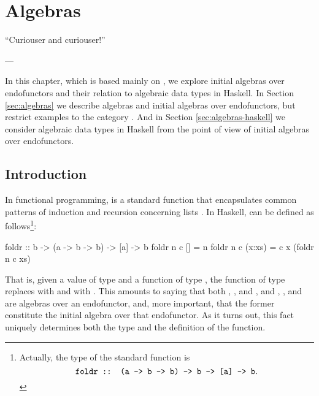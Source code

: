 \chapter{Algebras}
\label{chap:algebras}

\epigraph{
  ``Curiouser and curiouser!''
}{---\textcite[23]{carroll-2004}}

In this chapter, which is based mainly on \parencite[§
2.1]{vene-2000}, we explore initial algebras over endofunctors and
their relation to algebraic data types in Haskell. In
Section \ref{sec:algebras} we describe algebras and initial algebras
over endofunctors, but restrict examples to the category \set. And in
Section \ref{sec:algebras-haskell} we consider algebraic data types in
Haskell from the point of view of initial algebras over endofunctors.

\section{Introduction}
\label{sec:algebras-introduction}


In functional programming,  is a standard function
that encapsulates common patterns of induction and recursion
concerning lists \parencite[355--356]{hutton-1999}. In Haskell,
 can be defined as follows\footnote{Actually, the
  type of the standard  function is
  \begin{equation*}
    \text{\texttt{foldr :: (a -> b -> b) -> b -> [a] -> b}}
    \text{.}
  \end{equation*}
}:
\begin{codehaskell}
foldr :: b -> (a -> b -> b) -> [a] -> b
foldr n c []     = n
foldr n c (x:xs) = c x (foldr n c xs)
\end{codehaskell}
That is, given a value  of type  and a
function  of type , the
function  of type 
replaces \texthaskell{[]} with  and \texthaskell{(:)}
with . This amounts to saying that both
\texthaskell{[a]}, \texthaskell{[]}, and \texthaskell{(:)}, and
, , and  are algebras
over an endofunctor, and, more important, that the former constitute
the initial algebra over that endofunctor. As it turns out, this fact
uniquely determines both the type and the definition of the
 function.

